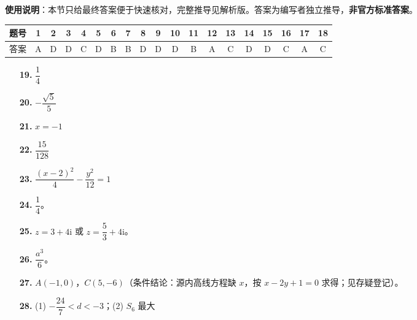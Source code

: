 
\begin{gknotice}
\textbf{使用说明}：本节只给最终答案便于快速核对，完整推导见解析版。答案为编写者独立推导，\textbf{非官方标准答案}。
\end{gknotice}

\begin{center}\begin{tabular}{ccccccccccccccccccc}
\toprule
题号 & 1 & 2 & 3 & 4 & 5 & 6 & 7 & 8 & 9 & 10 & 11 & 12 & 13 & 14 & 15 & 16 & 17 & 18 \\
\midrule
答案 & A & D & D & C & D & B & B & D & D & D & B & A & C & D & D & C & A & C \\
\bottomrule
\end{tabular}\end{center}

\begin{itemize}[leftmargin=2.6em]
  \item[\textbf{19.}] \(\dfrac14\)
  \item[\textbf{20.}] \(-\dfrac{\sqrt5}{5}\)
  \item[\textbf{21.}] \(x=-1\)
  \item[\textbf{22.}] \(\dfrac{15}{128}\)
  \item[\textbf{23.}] \(\dfrac{(x-2)^2}{4}-\dfrac{y^2}{12}=1\)
\end{itemize}

\begin{itemize}[leftmargin=2.6em]
  \item[\textbf{24.}] \(\dfrac14\)。
  \item[\textbf{25.}] \(z=3+4\mathrm{i}\) 或 \(z=\dfrac53+4\mathrm{i}\)。
  \item[\textbf{26.}] \(\dfrac{a^3}{6}\)。
  \item[\textbf{27.}] \(A(-1,0)\)，\(C(5,-6)\)（条件结论：源内高线方程缺 \(x\)，按 \(x-2y+1=0\) 求得；见存疑登记）。
  \item[\textbf{28.}] (1) \(-\dfrac{24}{7}<d<-3\)；(2) \(S_6\) 最大
\end{itemize}
